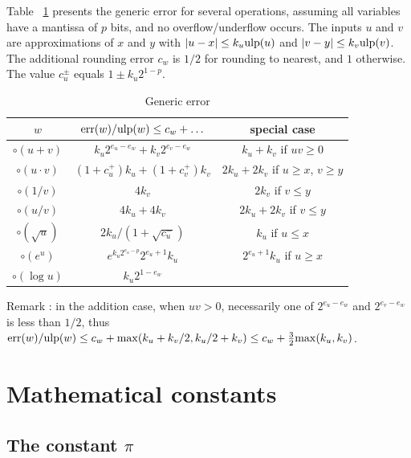 \documentclass[12pt]{amsart}
\def\ulp{{\rm ulp}}
\def\err{{\rm err}}
\begin{document}
Table ~\ref{table:genericError} presents the generic error for several operations, assuming all variables have a
mantissa of $p$ bits, and no overflow/underflow occurs.
The inputs $u$ and $v$ are
approximations of $x$ and $y$ with $|u-x| \le k_u \ulp(u)$ and
$|v-y| \le k_v \ulp(v)$. The additional rounding error $c_w$ is $1/2$ for
rounding to nearest, and $1$ otherwise.
The value $c^{\pm}_u$ equals $1 \pm k_u 2^{1-p}$.

\begin{table}[ht]
\begin{center}
\begin{tabular}{|c|c|c|} \hline
   $w$        & $\err(w)/\ulp(w) \le c_w + \ldots$ &special case\\ \hline\hline
$\circ(u+v)$ & $k_u 2^{e_u-e_w} + k_v 2^{e_v-e_w}$ & $k_u + k_v$ if $u v \ge 0$\\
$\circ(u \cdot v)$ & $(1+c^{+}_u)k_u + (1+c^{+}_v)k_v$ & $2k_u + 2k_v$ if $u \ge x$, $v \ge y$\\
$\circ(1/v)$ & $4 k_v$ & $2 k_v$ if $v \le y$ \\
$\circ(u/v)$ & $4 k_u + 4 k_v$ & $2 k_u + 2 k_v$ if $v \le y$ \\
$\circ(\sqrt{u})$ & $2 k_u/(1+\sqrt{c^{-}_u})$ & $k_u$ if $u \le x$ \\
$\circ(e^u)$ & $e^{k_u 2^{e_u-p}} 2^{e_u+1} k_u$ & $2^{e_u+1} k_u$ if $u \ge x$ \\
$\circ(\log u)$ & $k_u 2^{1-e_w}$ & \\
\hline
\end{tabular}
\end{center}
\caption{Generic error}
\label{table:genericError}
\end{table}
Remark : in the addition case, when $u v > 0$,
necessarily one of $2^{e_u-e_w}$ and $2^{e_v-e_w}$ is less than $1/2$,
thus $\err(w)/\ulp(w) \le c_w + {\rm max}(k_u + k_v/2, k_u/2 + k_v)
        \le c_w + \frac{3}{2} {\rm max}(k_u, k_v)$.

\section{Mathematical constants}

\subsection{The constant $\pi$}
\end{document}
